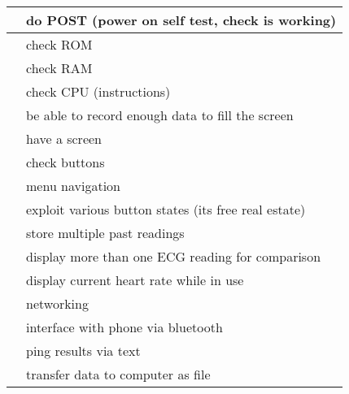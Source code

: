 \documentclass[a4paper]{article}
\begin{document}
\begin{flushleft}
\begin{supertabular}{|m{2.8899999cm}|m{8.253cm}|}
 &
{\color{black} do POST (power on self test, check is working)}\\\hline
{} &
{\color{black} check ROM}\\\hline
{} &
{\color{black} check RAM}\\\hline
{} &
{\color{black} check CPU (instructions)}\\\hline
{} &
{\color{black} be able to record enough data to fill the screen}\\\hline
{} &
{\color{black} have a screen}\\\hline
{} &
{\color{black} check buttons}\\\hline
{} &
{\color{black} menu navigation}\\\hline
{} &
{\color{black} exploit various button states (its free real estate)}\\\hline
{} &
{\color{black} store multiple past readings}\\\hline
{} &
{\color{black} display more than one ECG reading for comparison}\\\hline
{} &
{\color{black} display current heart rate while in use}\\\hline
{} &
{\color{black} networking}\\\hline
{} &
{\color{black} interface with phone via bluetooth}\\\hline
{} &
{\color{black} ping results via text}\\\hline
{} &
{\color{black} transfer data to computer as file}\\\hline

\end{supertabular}
\end{flushleft}
\end{document}
